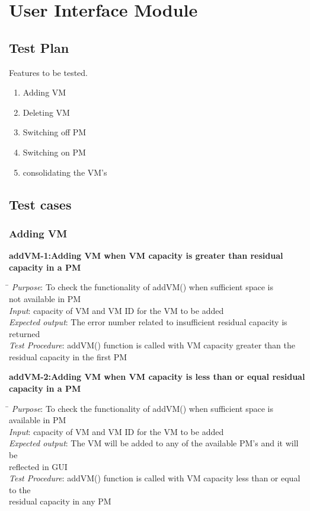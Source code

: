 \documentclass[a4paper,10pt]{article}
\begin{document}
\section{User Interface Module}
\subsection{Test Plan}
Features to be tested.
\begin{enumerate}
 \item Adding VM 
 \item Deleting VM
 \item Switching off PM
 \item Switching on PM
 \item consolidating the VM's
 \end{enumerate}
\subsection{Test cases}
\subsubsection{Adding VM}
\textbf{addVM-1:Adding VM when VM capacity is greater than residual capacity in a PM}
\begin{tabbing}
  \hspace*{4cm}\= \kill
\emph{Purpose}\>: To check the functionality of addVM() when sufficient space is\\ \> not available in PM\\
\emph{Input}\>: capacity of VM and VM ID for the VM to be added\\
\emph{Expected output}\>: The error number related to insufficient residual capacity is returned\\
\emph{Test Procedure}\>: addVM() function is called with VM capacity greater than the \\ \>residual capacity 
in the first PM\\
\end{tabbing}
\textbf{addVM-2:Adding VM when VM capacity is less than or equal residual capacity in a PM}
\begin{tabbing}
  \hspace*{4cm}\= \kill
\emph{Purpose}\>: To check the functionality of addVM() when sufficient space is\\ \> available in PM\\
\emph{Input}\>: capacity of VM and VM ID for the VM to be added\\
\emph{Expected output}\>: The VM will be added to any of the available PM's and it will be\\ \>reflected in GUI\\
\emph{Test Procedure}\>: addVM() function is called with VM capacity less than or equal to the \\ \>residual capacity 
in any PM\\
\end{tabbing}
\end{document}
